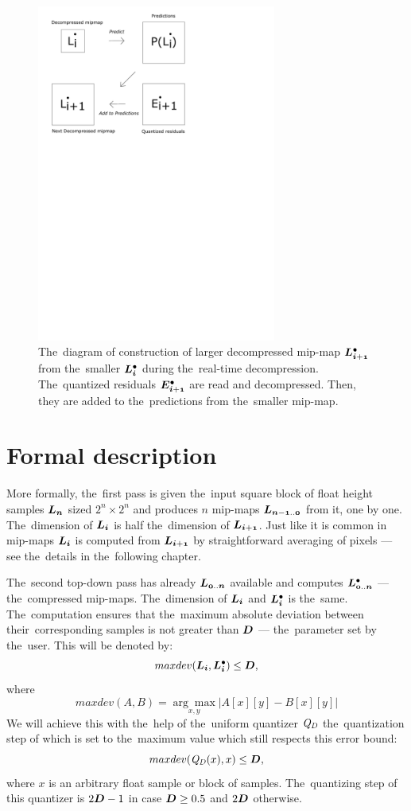 \begin{figure}
	\includegraphics[trim={1cm 18cm 7cm 0cm}, clip, width=0.7\textwidth]{figures/single_decomp.pdf}\centering
	\caption{The~diagram of construction of larger decompressed mip-map $\ldot{i+1}$ from the~smaller $\ldot{i}$ during the~real-time decompression. The~quantized residuals $\objdot{E}{i+1}$ are read and decompressed. Then, they are added to the~predictions from the~smaller mip-map.}
	\label{fig:single_decomp}
\end{figure}

\section{Formal description}

More formally, the~first pass is given the~input square block of float height samples $\lnorm{n}$ sized $2^n \times 2^n$ and produces $n$ mip-maps $\lnorm{n-1..0}$ from it, one by one. The~dimension of $\lnorm{i}$ is half the~dimension of $\lnorm{i+1}$. Just like it is common in mip-maps $\lnorm{i}$ is computed from $\lnorm{i+1}$ by straightforward averaging of pixels --- see the~details in the~following chapter. 

The~second top-down pass has already $\lnorm{0..n}$ available and computes $\ldot{0..n}$ --- the~compressed mip-maps. The~dimension of $\lnorm{i}$ and $\ldot{i}$ is the~same. The~computation ensures that the~maximum absolute deviation between their~corresponding samples is not greater than $\objnorm{D}{}$ --- the~parameter set by the~user. This will be denoted by:
$$maxdev(\lnorm{i}, \ldot{i}) \leq \objnorm{D}{},$$
where
$$maxdev(A, B) = \underset{x, y}{\arg\max}|A[x][y] - B[x][y]|$$
We will achieve this with the~help of the~uniform quantizer $\mathit{Q_{D}}$ the~quantization step of which is set to the~maximum value which still respects this error bound:
$$maxdev(\dnorm(x), x) \leq \objnorm{D}{},$$
where $x$ is an arbitrary float sample or block of samples.
The~quantizing step of this quantizer is $2\objnorm{D}{} - 1$ in case $\objnorm{D}{} \geq 0.5$ and $2\objnorm{D}{}$ otherwise.


